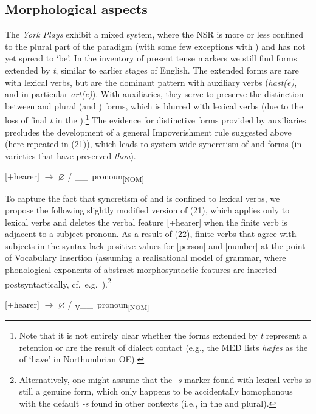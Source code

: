 \documentclass[output=paper]{langsci/langscibook}
\begin{document}
\subsection{Morphological aspects}
The \emph{York Plays} exhibit a mixed system, where the \gls{NSR} is more or less confined to the plural part of the paradigm (with
some few exceptions with \Fsg{}) and has not yet spread to `be'. In the
inventory of present tense markers we still find \Ssg{} forms extended by
\emph{t}, similar to earlier stages of English. The extended forms are rare
with lexical verbs, but are the dominant pattern with auxiliary
verbs (\emph{hast(e)}, and in particular \emph{art(e)}). With auxiliaries, they
serve to preserve the distinction between \Ssg{} and plural (and \Tsg{}) forms,
which is blurred with lexical verbs (due to the loss of final \emph{t} in the
\Ssg{}).\footnote{Note that it is not entirely clear whether the \Ssg{} forms
extended by \emph{t} represent a retention or are the result of dialect contact
(e.g., the MED lists \emph{hæfes} as the \Ssg{} of `have' in Northumbrian
\gls{OE}).} The evidence for distinctive \Ssg{} forms provided by auxiliaries
precludes the development of a general Impoverishment rule
suggested above (here repeated in (21)), which leads to system-wide syncretism
of \Ssg{} and \Tsg{} forms (in varieties that have preserved \emph{thou}).

\ea
\mbox{[+hearer]} {$\rightarrow$ $\varnothing$} / \_\_\ pronoun\textsubscript{[NOM]}
\z

To capture the fact that syncretism of \Ssg{} and \Tsg{} is confined to lexical
verbs, we propose the following slightly modified version of (21), which
applies only to lexical verbs and deletes the verbal  feature
[+hearer] when the finite verb is adjacent to a \Ssg{} subject pronoun. As a
result of (22), finite verbs that agree with \Ssg{} subjects in the syntax lack
positive values for [person] and [number] at the point of Vocabulary Insertion
(assuming a realisational model of grammar, where phonological exponents of
abstract morphosyntactic features are inserted postsyntactically, cf.\ e.g.\
\citealt{HalleMarantz1993}).\footnote{Alternatively, one might assume that the
\emph{-s}-marker found with \Ssg{} lexical verbs is still a genuine \Ssg{}
form, which only happens to be accidentally homophonous with the default
\emph{-s} found in other contexts (i.e., in the \Tsg{} and plural).}

\ea
\mbox{[+hearer]} {$\rightarrow$ $\varnothing$} / \textsubscript{V}\_\_\ pronoun\textsubscript{[NOM]}
\z
\end{document}

